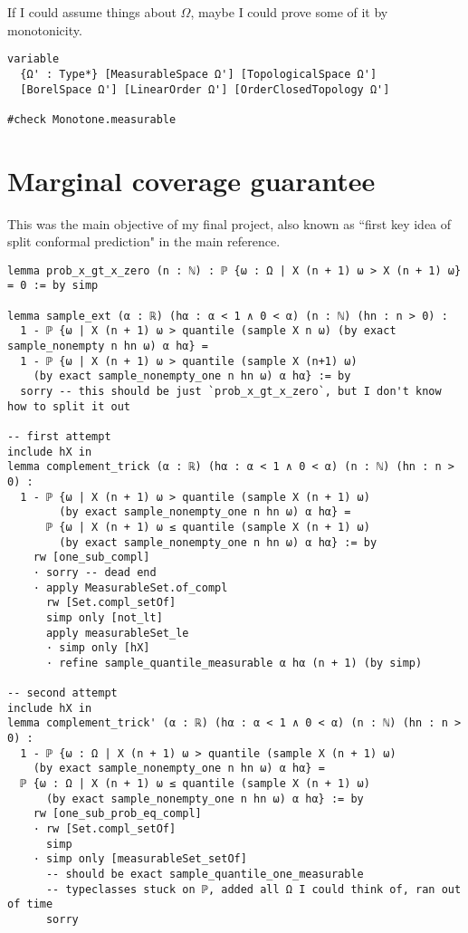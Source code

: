 \documentclass[a4paper, 12pt]{article}
\begin{document}
If I could assume things about $\Omega$,
maybe I could prove some of it by monotonicity.

\begin{lstlisting}
variable
  {Ω' : Type*} [MeasurableSpace Ω'] [TopologicalSpace Ω']
  [BorelSpace Ω'] [LinearOrder Ω'] [OrderClosedTopology Ω']

#check Monotone.measurable
\end{lstlisting}














\section*{Marginal coverage guarantee}

This was the main objective of my final project,
also known as ``first key idea of split conformal prediction" in the main reference.

\begin{lstlisting}
lemma prob_x_gt_x_zero (n : ℕ) : ℙ {ω : Ω | X (n + 1) ω > X (n + 1) ω} = 0 := by simp

lemma sample_ext (α : ℝ) (hα : α < 1 ∧ 0 < α) (n : ℕ) (hn : n > 0) :
  1 - ℙ {ω | X (n + 1) ω > quantile (sample X n ω) (by exact sample_nonempty n hn ω) α hα} =
  1 - ℙ {ω | X (n + 1) ω > quantile (sample X (n+1) ω)
    (by exact sample_nonempty_one n hn ω) α hα} := by
  sorry -- this should be just `prob_x_gt_x_zero`, but I don't know how to split it out

-- first attempt
include hX in
lemma complement_trick (α : ℝ) (hα : α < 1 ∧ 0 < α) (n : ℕ) (hn : n > 0) :
  1 - ℙ {ω | X (n + 1) ω > quantile (sample X (n + 1) ω)
        (by exact sample_nonempty_one n hn ω) α hα} =
      ℙ {ω | X (n + 1) ω ≤ quantile (sample X (n + 1) ω)
        (by exact sample_nonempty_one n hn ω) α hα} := by
    rw [one_sub_compl]
    · sorry -- dead end
    · apply MeasurableSet.of_compl
      rw [Set.compl_setOf]
      simp only [not_lt]
      apply measurableSet_le
      · simp only [hX]
      · refine sample_quantile_measurable α hα (n + 1) (by simp)

-- second attempt
include hX in
lemma complement_trick' (α : ℝ) (hα : α < 1 ∧ 0 < α) (n : ℕ) (hn : n > 0) :
  1 - ℙ {ω : Ω | X (n + 1) ω > quantile (sample X (n + 1) ω)
    (by exact sample_nonempty_one n hn ω) α hα} =
  ℙ {ω : Ω | X (n + 1) ω ≤ quantile (sample X (n + 1) ω)
      (by exact sample_nonempty_one n hn ω) α hα} := by
    rw [one_sub_prob_eq_compl]
    · rw [Set.compl_setOf]
      simp
    · simp only [measurableSet_setOf]
      -- should be exact sample_quantile_one_measurable
      -- typeclasses stuck on ℙ, added all Ω I could think of, ran out of time
      sorry
\end{lstlisting}
\end{document}
